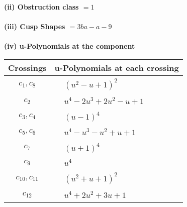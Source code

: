 \documentclass[1p]{elsarticle_modified}
\theoremstyle{definition}
\begin{document}
\flushleft \textbf{(ii) Obstruction class $= 1$}\\~\\
\flushleft \textbf{(iii) Cusp Shapes $= 3 b a- a-9$}\\~\\
\newpage\renewcommand{\arraystretch}{1}
\flushleft \textbf{(iv) u-Polynomials at the component}\newline \\
\begin{tabular}{m{50pt}|m{274pt}}
Crossings & \hspace{64pt}u-Polynomials at each crossing \\
\hline $$\begin{aligned}c_{1},c_{8}\end{aligned}$$&$\begin{aligned}
&(u^2- u+1)^2
\end{aligned}$\\
\hline $$\begin{aligned}c_{2}\end{aligned}$$&$\begin{aligned}
&u^4-2 u^3+2 u^2- u+1
\end{aligned}$\\
\hline $$\begin{aligned}c_{3},c_{4}\end{aligned}$$&$\begin{aligned}
&(u-1)^4
\end{aligned}$\\
\hline $$\begin{aligned}c_{5},c_{6}\end{aligned}$$&$\begin{aligned}
&u^4- u^3- u^2+u+1
\end{aligned}$\\
\hline $$\begin{aligned}c_{7}\end{aligned}$$&$\begin{aligned}
&(u+1)^4
\end{aligned}$\\
\hline $$\begin{aligned}c_{9}\end{aligned}$$&$\begin{aligned}
&u^4
\end{aligned}$\\
\hline $$\begin{aligned}c_{10},c_{11}\end{aligned}$$&$\begin{aligned}
&(u^2+u+1)^2
\end{aligned}$\\
\hline $$\begin{aligned}c_{12}\end{aligned}$$&$\begin{aligned}
&u^4+2 u^2+3 u+1
\end{aligned}$\\
\hline
\end{tabular}\\~\\
\end{document}
